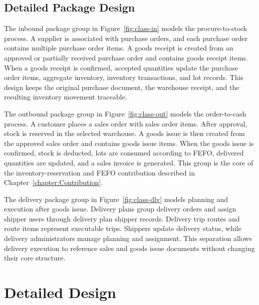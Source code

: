 \subsection{Detailed Package Design}
The inbound package group in Figure~\ref{fig:class-in} models the
procure-to-stock process. A supplier is associated with purchase orders, and
each purchase order contains multiple purchase order items. A goods receipt is
created from an approved or partially received purchase order and contains goods
receipt items. When a goods receipt is confirmed, accepted quantities update the
purchase order items, aggregate inventory, inventory transactions, and lot
records. This design keeps the original purchase document, the warehouse
receipt, and the resulting inventory movement traceable.

The outbound package group in Figure~\ref{fig:class-out} models the
order-to-cash process. A customer places a sales order with sales order items.
After approval, stock is reserved in the selected warehouse. A goods issue is
then created from the approved sales order and contains goods issue items. When
the goods issue is confirmed, stock is deducted, lots are consumed according to
FEFO, delivered quantities are updated, and a sales invoice is generated. This
group is the core of the inventory-reservation and FEFO contribution described
in Chapter~\ref{chapter:Contribution}.

The delivery package group in Figure~\ref{fig:class-dlv} models planning and
execution after goods issue. Delivery plans group delivery orders and assign
shipper users through delivery plan shipper records. Delivery trip routes and
route items represent executable trips. Shippers update delivery status, while
delivery administrators manage planning and assignment. This separation allows
delivery execution to reference sales and goods issue documents without changing
their core structure.

\section{Detailed Design}

